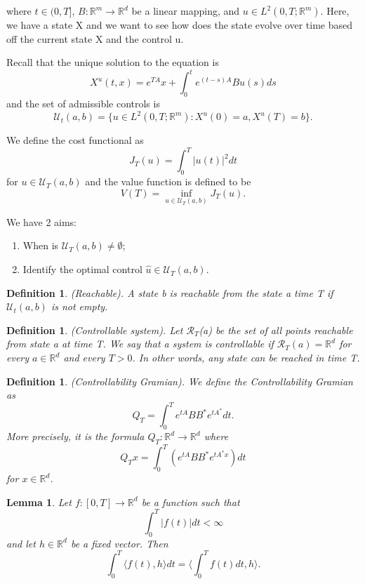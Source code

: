 \documentclass[twoside]{article}
\newtheorem{lemma}[theorem]{Lemma}
\newtheorem{definition}[theorem]{Definition}
\begin{document}
where $t \in (0, T]$, $B: \mathbb{R}^m \rightarrow \mathbb{R}^d$ be a linear mapping, and $u \in L^2(0,T;\mathbb{R}^m)$. Here, we have a state X and we want to see how does the state evolve over time based off the current state X and the control u. 

Recall that the unique solution to the equation is
$$
X^u(t, x) = e^{TA}x + \int_0^te^{(t-s)A}Bu(s)ds
$$
and the set of admissible controls is 
$$
\mathcal{U}_t(a,b) = \{u \in L^2(0, T; \mathbb{R}^m): X^u(0) = a, X^u(T) = b\}.
$$



We define the cost functional as 
$$
J_T(u) = \int_0^T|u(t)|^2dt
$$
for $u \in \mathcal{U}_T(a,b)$ and the value function is defined to be 
$$
V(T) = \inf_{u \in \mathcal{U}_T(a,b)}J_T(u).
$$

We have 2 aims:
\begin{enumerate}
\item When is $\mathcal{U}_T(a,b) \neq \emptyset$;
\item Identify the optimal control $\hat{u} \in \mathcal{U}_T(a,b).$
\end{enumerate}

\begin{definition}(Reachable). A state b is reachable from the state a time T if $\mathcal{U}_t(a, b)$ is not empty.
\end{definition}
\begin{definition}(Controllable system). Let $\mathcal{R}_T$(a) be the set of all points reachable from state a at time T. We say that a system is controllable if $\mathcal{R}_T(a) = \mathbb{R}^d$ for every $a \in \mathbb{R}^d$ and every $T > 0$. In other words, any state can be reached in time T.
\end{definition}

\begin{definition}(Controllability Gramian). We define the Controllability Gramian as 
$$
Q_T = \int_0^Te^{tA}BB^*e^{tA^{*}}dt.
$$
More precisely, it is the formula $Q_T: \mathbb{R}^d \rightarrow \mathbb{R}^d$ where 
$$
Q_Tx = \int_0^T(e^{tA}BB^*e^{tA^{*}x})dt
$$
for $x \in \mathbb{R}^d$.
\end{definition}

\begin{lemma}Let $f: [0,T] \rightarrow \mathbb{R}^d$ be a function such that 
$$
\int_0^T|f(t)|dt < \infty
$$
and let $h \in \mathbb{R}^d$ be a fixed vector. Then 
$$
\int_0^T\langle f(t), h\rangle dt = \langle \int_0^Tf(t)dt, h \rangle.
$$
\end{lemma}
\end{document}
